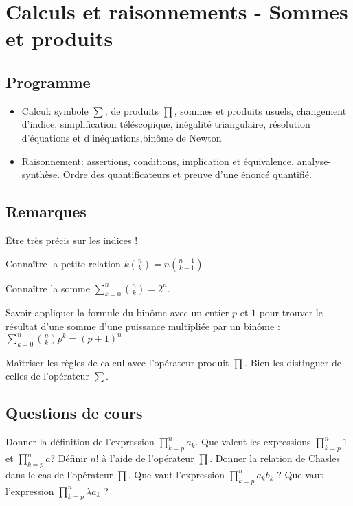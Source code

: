  \chapter{Calculs et raisonnements - Sommes et produits}
 
\section{Programme}
	\begin{itemize}
 	\item Calcul: symbole $\sum$, de produits $\prod$,  sommes et produits  usuels, changement d'indice, simplification téléscopique, inégalité triangulaire, résolution d’équations et d’inéquations,binôme de Newton
 	\item Raisonnement: assertions, conditions, implication et équivalence.  analyse-synthèse. Ordre des  quantificateurs et preuve d’une énoncé quantifié.
 \end{itemize}




\section{Remarques}


\NB Être très précis sur les indices !

\NB Connaître la petite relation $k\binom{n}{k}=n\binom{n-1}{k-1}$.

\NB Connaître la somme $\sum\limits_{k=0}^n \binom{n}{k}= 2^n$.

\NB Savoir appliquer la formule du binôme avec un entier $p$ et $1$ pour trouver le résultat d'une somme d'une puissance multipliée par un binôme : $\sum\limits_{k=0}^n \binom{n}{k} p^k= (p+1)^n$  

\NB Maîtriser les règles de calcul avec l'opérateur produit $\prod$. Bien les distinguer de celles de l'opérateur $\sum$. 

\section{Questions de cours}	



\begin{exercise}[subtitle=Règles de calcul associées à l'opérateur $\prod$, extype=cours]
	\begin{tasks} 
		\task Donner la définition de l'expression $ \prod\limits_{k=p}^n a_k$.
		\task Que valent les expressions $\prod\limits_{k=p}^n 1$ et  $\prod\limits_{k=p}^n a$?
		\task Définir $n!$ à l'aide de l'opérateur $\prod$. 
		\task Donner la relation de Chasles dans le cas de l'opérateur $\prod$.
		\task Que vaut l'expression $\prod\limits_{k=p}^n a_k b_k$ ?
		\task Que vaut l'expression $\prod\limits_{k=p}^n \lambda a_k$ ?
	\end{tasks}
\end{exercise}

